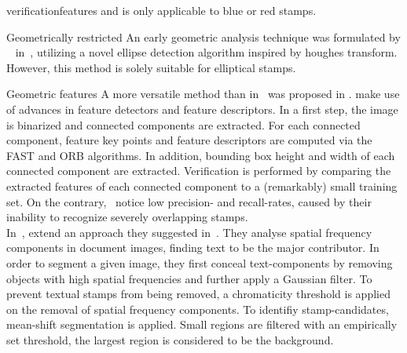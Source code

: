 \begin{description}
\begin{enumerate*}[label={\alph*)},font={\color{red!50!black}\bfseries}]
                    verificationfeatures and is only applicable to blue or red
                    stamps.\\
                \item [Geometrically restricted]
                    An early geometric analysis technique was formulated by
                    ~\citeauthor*{Zhu.2006} in~\cite{Zhu.2006}, utilizing a
                    novel ellipse detection algorithm inspired by houghes
                    transform. However, this method is solely suitable for
                    elliptical stamps.
        \end{enumerate*}
    \item [Generic approaches]
    \begin{enumerate*}[label={\alph*)},font={\color{red!50!black}\bfseries}]
        \item [Geometric features]
        A more versatile method than in~\cite{Zhu.2006} was proposed in
        \cite{Ahmed.25.08.201328.08.2013, Ahmed.2016}.
        \citeauthor*{Ahmed.25.08.201328.08.2013} make use of advances in
        feature detectors and feature descriptors. In a first step, the
        image is binarized and connected components are extracted. For each
        connected component, feature key points and feature descriptors are
        computed via the FAST and ORB algorithms. In addition, bounding box
        height and width of each connected component are extracted.
        Verification is performed by comparing the extracted features of each
        connected component to a (remarkably) small training set. On the
        contrary,~\citeauthor*{Ahmed.25.08.201328.08.2013} notice low precision-
        and recall-rates, caused by their inability to recognize severely
        overlapping stamps.\\
        In~\cite{Nandedkar.16.12.201519.12.2015},
        \citeauthor*{Nandedkar.16.12.201519.12.2015} extend an approach they
        suggested in~\cite{Nandedkar.23.08.201526.08.2015}. They analyse spatial
        frequency components in document images, finding text to be the major
        contributor. In order to segment a given image, they first conceal
        text-components by removing objects with high spatial frequencies and
        further apply a Gaussian filter. To prevent textual stamps from being
        removed, a chromaticity threshold is applied on the removal of spatial
        frequency components. To identifiy stamp-candidates, mean-shift
        segmentation is applied. Small regions are filtered with an empirically
        set threshold, the largest region is considered to be the background.

\end{enumerate*}
\end{description}
